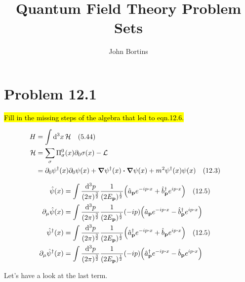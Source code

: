 \documentclass{article}
\title{Quantum Field Theory Problem Sets}
\author{John Bortins}
\begin{document}
\maketitle{}



\section*{Problem 12.1}
\begin{quoting}
    \hl{Fill in the missing steps of the algebra that led to eqn.12.6.}
\end{quoting}

\begin{align*}
    H           & =\int \dd[3]{x}\mathcal{H} \qq{(5.44)}                                                                                       \\
    \mathcal{H} & =\sum_\sigma \Pi^0_\sigma (x)\partial_0 \sigma(x)-\mathcal{L}                                                                \\
                & = \partial_0 \psi^\dagger (x)\partial_0 \psi(x)+\grad\psi^\dagger (x)\vdot\grad\psi(x)+m^2 \psi^\dagger(x)\psi(x)\qq{(12.3)} \\
\end{align*}

\begin{align*}
    \hat{\psi}(x)                       & =\int \frac{\dd[3]{p}}{(2\pi)^\frac{3}{2}}  \frac{1}{(2E_{\vb{p}})^{\frac{1}{2}}}  \pqty{\hat{a}_{\vb{p}}e^{-ip\vdot x}+\hat{b}^\dagger_{\vb{p}}e^{ip\vdot x}} \qq{(12.5)} \\
    \partial_\mu \hat{\psi}(x)          & =\int \frac{\dd[3]{p}}{(2\pi)^\frac{3}{2}}  \frac{1}{(2E_{\vb{p}})^{\frac{1}{2}}} (-ip) \pqty{\hat{a}_{\vb{p}}e^{-ip\vdot x}-\hat{b}^\dagger_{\vb{p}}e^{ip\vdot x}}        \\
    \hat{\psi}^\dagger (x)              & =\int \frac{\dd[3]{p}}{(2\pi)^\frac{3}{2}}  \frac{1}{(2E_{\vb{p}})^{\frac{1}{2}}}  \pqty{\hat{a}^\dagger_{\vb{p}}e^{-ip\vdot x}+\hat{b}_{\vb{p}}e^{ip\vdot x}} \qq{(12.5)} \\
    \partial_\mu \hat{\psi}^\dagger (x) & =\int \frac{\dd[3]{p}}{(2\pi)^\frac{3}{2}}  \frac{1}{(2E_{\vb{p}})^{\frac{1}{2}}} (-ip) \pqty{\hat{a}^\dagger_{\vb{p}}e^{-ip\vdot x}-\hat{b}_{\vb{p}}e^{ip\vdot x}}        \\
\end{align*}

Let's have a look at the last term.
\end{document}
